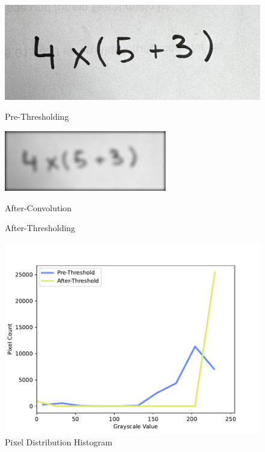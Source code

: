 \documentclass[@CLASSOPTIONS@]{tumarticle}
\begin{document}
\begin{figure}[!htb]
   \begin{minipage}{0.48\textwidth}
     \centering
     \includegraphics[width=.7\linewidth]{figures/real_data_1}
     \caption{Pre-Thresholding}\label{Fig:Data3}
   \end{minipage}\hfill
   \vspace{0.3cm}
   \begin{minipage}{0.48\textwidth}
     \centering
     \includegraphics[width=.7\linewidth]{figures/convolve}
     \caption{After-Convolution}\label{Fig:Data4_1}
   \end{minipage}
      \vspace{0.3cm}

   \begin{minipage}{0.48\textwidth}
     \centering
     \caption{After-Thresholding}\label{Fig:Data4}
   \end{minipage}
  \hfill
   \begin{minipage}{0.48\textwidth}
     \centering
     \includegraphics[width=.9\linewidth]{figures/histogram}
     \caption{Pixel Distribution Histogram}\label{Fig:Data5}
   \end{minipage}
\end{figure}
\end{document}
